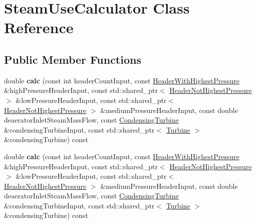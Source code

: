 \hypertarget{class_steam_use_calculator}{}\section{Steam\+Use\+Calculator Class Reference}
\label{class_steam_use_calculator}
\subsection*{Public Member Functions}
\begin{DoxyCompactItemize}
\item 
\mbox{\label{class_steam_use_calculator_a5239c06f11221cb897bc150e1f2ea503}} 
double {\bfseries calc} (const int header\+Count\+Input, const \hyperlink{class_header_with_highest_pressure}{Header\+With\+Highest\+Pressure} \&high\+Pressure\+Header\+Input, const std\+::shared\+\_\+ptr$<$ \hyperlink{class_header_not_highest_pressure}{Header\+Not\+Highest\+Pressure} $>$ \&low\+Pressure\+Header\+Input, const std\+::shared\+\_\+ptr$<$ \hyperlink{class_header_not_highest_pressure}{Header\+Not\+Highest\+Pressure} $>$ \&medium\+Pressure\+Header\+Input, const double deaerator\+Inlet\+Steam\+Mass\+Flow, const \hyperlink{class_condensing_turbine}{Condensing\+Turbine} \&condensing\+Turbine\+Input, const std\+::shared\+\_\+ptr$<$ \hyperlink{class_turbine}{Turbine} $>$ \&condensing\+Turbine) const
\item 
\mbox{\label{class_steam_use_calculator_a5239c06f11221cb897bc150e1f2ea503}} 
double {\bfseries calc} (const int header\+Count\+Input, const \hyperlink{class_header_with_highest_pressure}{Header\+With\+Highest\+Pressure} \&high\+Pressure\+Header\+Input, const std\+::shared\+\_\+ptr$<$ \hyperlink{class_header_not_highest_pressure}{Header\+Not\+Highest\+Pressure} $>$ \&low\+Pressure\+Header\+Input, const std\+::shared\+\_\+ptr$<$ \hyperlink{class_header_not_highest_pressure}{Header\+Not\+Highest\+Pressure} $>$ \&medium\+Pressure\+Header\+Input, const double deaerator\+Inlet\+Steam\+Mass\+Flow, const \hyperlink{class_condensing_turbine}{Condensing\+Turbine} \&condensing\+Turbine\+Input, const std\+::shared\+\_\+ptr$<$ \hyperlink{class_turbine}{Turbine} $>$ \&condensing\+Turbine) const
\item 
\mbox{\label{class_steam_use_calculator_a5239c06f11221cb897bc150e1f2ea503}} 

\end{DoxyCompactItemize}
